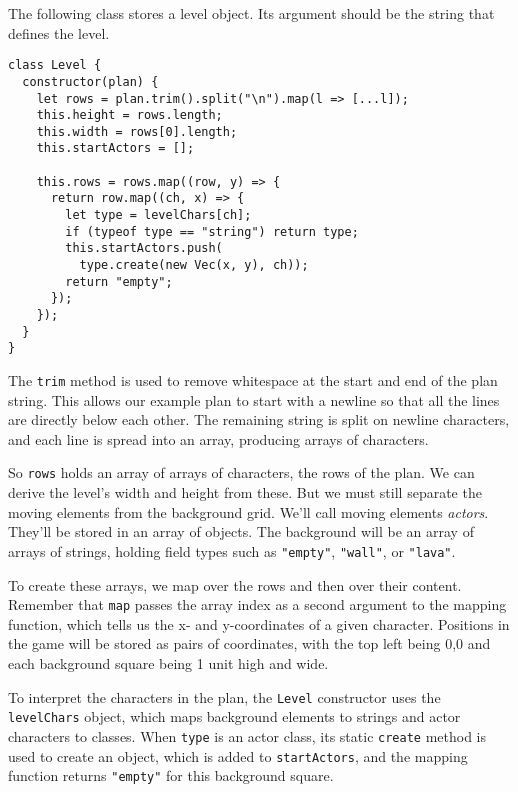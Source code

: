 The following class stores a level object. Its argument should be the string that defines the level.

\begin{lstlisting}
class Level {
  constructor(plan) {
    let rows = plan.trim().split("\n").map(l => [...l]);
    this.height = rows.length;
    this.width = rows[0].length;
    this.startActors = [];

    this.rows = rows.map((row, y) => {
      return row.map((ch, x) => {
        let type = levelChars[ch];
        if (typeof type == "string") return type;
        this.startActors.push(
          type.create(new Vec(x, y), ch));
        return "empty";
      });
    });
  }
}
\end{lstlisting}
\noindent{}

The \lstinline`trim` method is used to remove whitespace at the start and end of the plan string. This allows our example plan to start with a newline so that all the lines are directly below each other. The remaining string is split on newline characters, and each line is spread into an array, producing arrays of characters.

So \lstinline`rows` holds an array of arrays of characters, the rows of the plan. We can derive the level's width and height from these. But we must still separate the moving elements from the background grid. We'll call moving elements \emph{actors}. They'll be stored in an array of objects. The background will be an array of arrays of strings, holding field types such as \lstinline`"empty"`, \lstinline`"wall"`, or \lstinline`"lava"`.

To create these arrays, we map over the rows and then over their content. Remember that \lstinline`map` passes the array index as a second argument to the mapping function, which tells us the x- and y-coordinates of a given character. Positions in the game will be stored as pairs of coordinates, with the top left being 0,0 and each background square being 1 unit high and wide.

To interpret the characters in the plan, the \lstinline`Level` constructor uses the \lstinline`levelChars` object, which maps background elements to strings and actor characters to classes. When \lstinline`type` is an actor class, its static \lstinline`create` method is used to create an object, which is added to \lstinline`startActors`, and the mapping function returns \lstinline`"empty"` for this background square.

